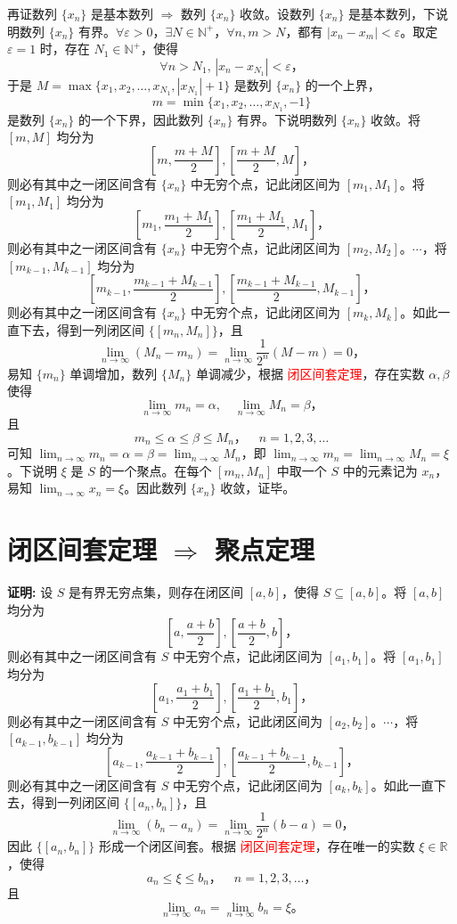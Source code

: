 \documentclass[lang=cn,newtx,10pt,scheme=chinese]{elegantbook}
\begin{document}
再证数列 $\{x_n\}$ 是基本数列 $\Rightarrow$ 数列 $\{x_n\}$ 收敛。设数列 $\{x_n\}$ 是基本数列，下说明数列 $\{x_n\}$ 有界。$\forall \varepsilon > 0$，$\exists N \in \mathbb{N}^+$，$\forall n, m > N$，都有 $|x_n - x_m| < \varepsilon$。取定 $\varepsilon = 1$ 时，存在 $N_1 \in \mathbb{N}^+$，使得
\[
\forall n > N_1, \, |x_n - x_{N_1}| < \varepsilon，
\]
于是 $M = \max \{x_1, x_2, \ldots, x_{N_1}, |x_{N_1}| + 1\}$ 是数列 $\{x_n\}$ 的一个上界，
\[
m = \min \{x_1, x_2, \ldots, x_{N_1}, -1\}
\]
是数列 $\{x_n\}$ 的一个下界，因此数列 $\{x_n\}$ 有界。下说明数列 $\{x_n\}$ 收敛。将 $[m, M]$ 均分为
\[
\left[m, \frac{m + M}{2}\right], \left[\frac{m + M}{2}, M\right]，
\]
则必有其中之一闭区间含有 $\{x_n\}$ 中无穷个点，记此闭区间为 $[m_1, M_1]$。将 $[m_1, M_1]$ 均分为
\[
\left[m_1, \frac{m_1 + M_1}{2}\right], \left[\frac{m_1 + M_1}{2}, M_1\right]，
\]
则必有其中之一闭区间含有 $\{x_n\}$ 中无穷个点，记此闭区间为 $[m_2, M_2]$。$\cdots$，将 $[m_{k-1}, M_{k-1}]$ 均分为
\[
\left[m_{k-1}, \frac{m_{k-1} + M_{k-1}}{2}\right], \left[\frac{m_{k-1} + M_{k-1}}{2}, M_{k-1}\right]，
\]
则必有其中之一闭区间含有 $\{x_n\}$ 中无穷个点，记此闭区间为 $[m_k, M_k]$。如此一直下去，得到一列闭区间 $\{[m_n, M_n]\}$，且
\[
\lim_{n \to \infty} (M_n - m_n) = \lim_{n \to \infty} \frac{1}{2^n} (M - m) = 0，
\]
易知 $\{m_n\}$ 单调增加，数列 $\{M_n\}$ 单调减少，根据 \textcolor{red}{闭区间套定理}，存在实数 $\alpha, \beta$ 使得
\[
\lim_{n \to \infty} m_n = \alpha, \quad \lim_{n \to \infty} M_n = \beta，
\]
且
\[
m_n \leq \alpha \leq \beta \leq M_n， \quad n = 1, 2, 3, \ldots
\]
可知 $\lim_{n \to \infty} m_n = \alpha = \beta = \lim_{n \to \infty} M_n$，即 $\lim_{n \to \infty} m_n = \lim_{n \to \infty} M_n = \xi$。下说明 $\xi$ 是 $S$ 的一个聚点。在每个 $[m_n, M_n]$ 中取一个 $S$ 中的元素记为 $x_n$，易知 $\lim_{n \to \infty} x_n = \xi$。因此数列 $\{x_n\}$ 收敛，证毕。


\section*{闭区间套定理 $\Rightarrow$ 聚点定理}

\textbf{证明:} 设 $S$ 是有界无穷点集，则存在闭区间 $[a, b]$，使得 $S \subseteq [a, b]$。将 $[a, b]$ 均分为
\[
\left[ a, \frac{a + b}{2} \right], \left[ \frac{a + b}{2}, b \right]，
\]
则必有其中之一闭区间含有 $S$ 中无穷个点，记此闭区间为 $[a_1, b_1]$。将 $[a_1, b_1]$ 均分为
\[
\left[ a_1, \frac{a_1 + b_1}{2} \right], \left[ \frac{a_1 + b_1}{2}, b_1 \right]，
\]
则必有其中之一闭区间含有 $S$ 中无穷个点，记此闭区间为 $[a_2, b_2]$。$\cdots$，将 $[a_{k-1}, b_{k-1}]$ 均分为
\[
\left[ a_{k-1}, \frac{a_{k-1} + b_{k-1}}{2} \right], \left[ \frac{a_{k-1} + b_{k-1}}{2}, b_{k-1} \right]，
\]
则必有其中之一闭区间含有 $S$ 中无穷个点，记此闭区间为 $[a_k, b_k]$。如此一直下去，得到一列闭区间 $\{[a_n, b_n]\}$，且
\[
\lim_{n \to \infty} (b_n - a_n) = \lim_{n \to \infty} \frac{1}{2^n} (b - a) = 0，
\]
因此 $\{[a_n, b_n]\}$ 形成一个闭区间套。根据 \textcolor{red}{闭区间套定理}，存在唯一的实数 $\xi \in \mathbb{R}$，使得
\[
a_n \leq \xi \leq b_n，\quad n = 1, 2, 3, \ldots，
\]
且
\[
\lim_{n \to \infty} a_n = \lim_{n \to \infty} b_n = \xi。
\]
\end{document}
